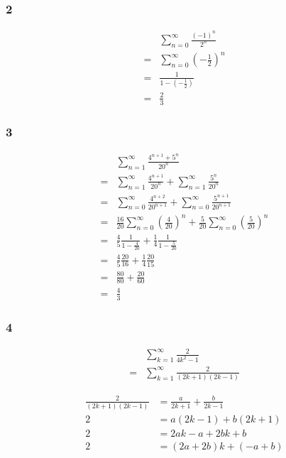 \documentclass[12pt]{article}
\newcommand{\round}[1]{\left(       #1 \right)      }
\begin{document}
\subsubsection*{2}
\begin{align*}
     & \sum_{n=0}^\infty \frac{(-1)^n}{2^n} \\
    =& \sum_{n=0}^\infty \round{-\frac{1}{2}}^n \\
    =& \frac{1}{1 - \round{-\frac{1}{2}}} \\
    =& \frac{2}{3}
\end{align*}

\subsubsection*{3}
\begin{align*}
     & \sum_{n=1}^\infty \frac{4^{n+1} + 5^n}{20^n} \\
    =& \sum_{n=1}^\infty \frac{4^{n+1}}{20^n} + \sum_{n=1}^\infty \frac{5^n}{20^n} \\
    =& \sum_{n=0}^\infty \frac{4^{n+2}}{20^{n+1}} + \sum_{n=0}^\infty \frac{5^{n+1}}{20^{n+1}} \\
    =& \frac{16}{20} \sum_{n=0}^\infty \round{\frac{4}{20}}^n + \frac{5}{20} \sum_{n=0}^\infty \round{\frac{5}{20}}^n \\
    =& \frac{4}{5} \frac{1}{1-\frac{4}{20}} + \frac{1}{4} \frac{1}{1-\frac{5}{20}} \\
    =& \frac{4}{5} \frac{20}{16} + \frac{1}{4} \frac{20}{15} \\
    =& \frac{80}{80} + \frac{20}{60} \\
    =& \frac{4}{3}
\end{align*}

\subsubsection*{4}
\begin{align*}
     & \sum_{k=1}^\infty \frac{2}{4k^2 - 1} \\
    =& \sum_{k=1}^\infty \frac{2}{(2k+1)(2k-1)}
\end{align*}

\begin{align*}
    \frac{2}{(2k+1)(2k-1)} &= \frac{a}{2k+1} + \frac{b}{2k-1} \\
    2 &= a(2k-1) + b(2k+1) \\
    2 &= 2ak - a + 2bk + b \\
    2 &= (2a+2b)k + (-a+b)
\end{align*}
\end{document}
